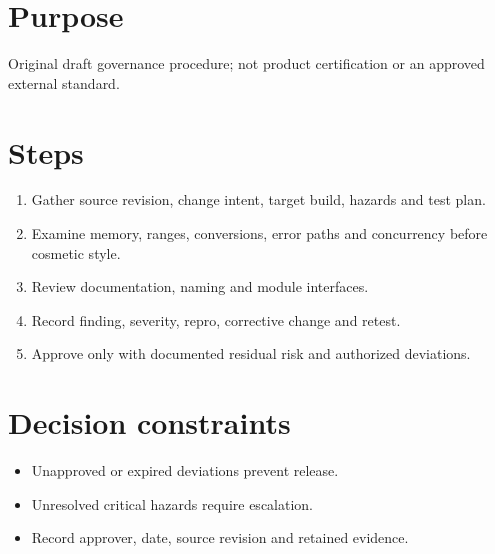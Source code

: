 \documentclass[10pt,letterpaper]{article}
\begin{document}
\makedoctitle
\makedocsummary
\section{Purpose}
Original draft governance procedure; not product certification or an approved external standard.
\section{Steps}
\begin{enumerate}
\item Gather source revision, change intent, target build, hazards and test plan.
\item Examine memory, ranges, conversions, error paths and concurrency before cosmetic style.
\item Review documentation, naming and module interfaces.
\item Record finding, severity, repro, corrective change and retest.
\item Approve only with documented residual risk and authorized deviations.
\end{enumerate}

\section{Decision constraints}
\begin{itemize}
\item Unapproved or expired deviations prevent release.
\item Unresolved critical hazards require escalation.
\item Record approver, date, source revision and retained evidence.
\end{itemize}
\end{document}
